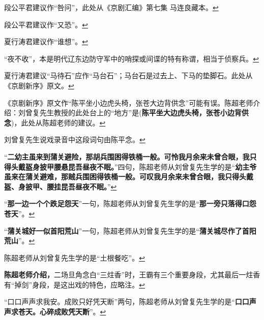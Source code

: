   段公平君建议作``咎问''，此处从《京剧汇编》第七集
  马连良藏本。\protect\hyperlink{fnref113}{↩}
\item
  \leavevmode\hypertarget{fn114}{}%
  段公平君建议作``又恐''。\protect\hyperlink{fnref114}{↩}
\item
  \leavevmode\hypertarget{fn115}{}%
  夏行涛君建议作``谁想''。\protect\hyperlink{fnref115}{↩}
\item
  \leavevmode\hypertarget{fn116}{}%
  ``夜不收''，本是明代辽东边防守军中的哨探或间谍的特有称谓，相当于侦察兵。\protect\hyperlink{fnref116}{↩}
\item
  \leavevmode\hypertarget{fn117}{}%
  夏行涛君建议``马待石''应作``马台石''；马台石是过去上、下马的垫脚石。此处从《京剧新序》原文。\protect\hyperlink{fnref117}{↩}
\item
  \leavevmode\hypertarget{fn118}{}%
  《京剧新序》原文作``陈平坐小边虎头椅，张苍大边背供念''可能有误。陈超老师介绍：刘曾复先生教授的此处台上的``地方''是(\textbf{陈平坐大边虎头椅，张苍小边背供念})，此处从陈超老师的建议。\protect\hyperlink{fnref118}{↩}
\item
  \leavevmode\hypertarget{fn119}{}%
  刘曾复先生说戏录音中这段词句由陈平念。\protect\hyperlink{fnref119}{↩}
\item
  \leavevmode\hypertarget{fn120}{}%
  ``\textbf{二幼主虽来到蒲关避险，那胡兵围困得铁桶一般。可怜我月余来未曾合眼，我只得头戴盔身披甲腰悬昆吾昼夜不眠。}''四句，陈超老师从刘曾复先生学的是``\textbf{幼主爷虽来在蒲关避难，那贼兵围困得铁桶一般。可叹我月余来未曾合眼，我只得头戴盔、身披甲、腰挂昆吾昼夜不眠。}''\protect\hyperlink{fnref120}{↩}
\item
  \leavevmode\hypertarget{fn121}{}%
  ``\textbf{那一边一个个跌足怨天}''一句，陈超老师从刘曾复先生学的是``\textbf{那一旁只落得口怨苍天}''。\protect\hyperlink{fnref121}{↩}
\item
  \leavevmode\hypertarget{fn122}{}%
  ``\textbf{蒲关城好一似首阳荒山}''一句，陈超老师从刘曾复先生学的是``\textbf{蒲关城尽作了首阳荒山}''。\protect\hyperlink{fnref122}{↩}
\item
  \leavevmode\hypertarget{fn123}{}%
  陈超老师从刘曾复先生学的是``土根餐吃''。\protect\hyperlink{fnref123}{↩}
\item
  \leavevmode\hypertarget{fn124}{}%
  \textbf{陈超老师介绍，}二场旦角念白``三炷香''时，王霸有三个重要身段，尤其最后一炷香有``掉剑''身段，是这出戏的特色，应略注。\protect\hyperlink{fnref124}{↩}
\item
  \leavevmode\hypertarget{fn125}{}%
  ``口口声声求我安。成败只好凭天断''两句，陈超老师从刘曾复先生学的是``\textbf{口口声声求苍天。心碎成败凭天断}''。\protect\hyperlink{fnref125}{↩}
